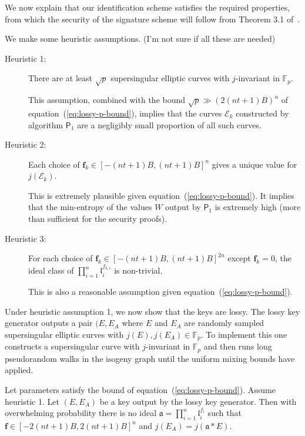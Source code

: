 \documentclass{llncs}
\newcommand{\E}{\mathcal{E}}
\newcommand{\F}{\mathbb{F}}
\renewcommand{\a}{\mathfrak{a}}
\renewcommand{\l}{\mathfrak{l}}
\newcommand{\f}{\mathbf{f}}
\newcommand{\PP}{\mathsf{P}}
\begin{document}
We now explain that our identification scheme satisfies the required properties, from which the security of the signature scheme will follow from Theorem 3.1 of~\cite{KLS18}.

We make some heuristic assumptions.
(I'm not sure if all these are needed)
\begin{description}
\item[Heuristic 1:] There are at least $\sqrt{p}$ supersingular elliptic curves with $j$-invariant in $\F_p$.

This assumption, combined with the bound $\sqrt{p} \gg (2(nt+1)B)^n $ of equation~(\ref{eq:lossy-p-bound}), implies that the curves $\E_k$ constructed by algorithm $\PP_1$ are a negligibly small proportion of all such curves.

\item[Heuristic 2:] Each choice of $\f_k \in [-(nt+1)B,(nt+1)B]^n$ gives a unique value for $j(\E_k)$.

This is extremely plausible given equation~(\ref{eq:lossy-p-bound}). It implies that the min-entropy of the values $W$ output by $\PP_1$ is extremely high (more than sufficient for the security proofs).

\item[Heuristic 3:] For each choice of $\f_k \in [-(nt+1)B,(nt+1)B]^{2n}$ except $\f_k = 0$, the ideal class of $\prod_{i=1}^n \l_i^{f_{k,i}}$ is non-trivial.

This is also a reasonable assumption given equation~(\ref{eq:lossy-p-bound}).
\end{description}

Under heuristic assumption 1, we now show that the keys are lossy.
The lossy key generator outputs a pair $(E,E_A$ where $E$ and $E_A$ are randomly sampled supersingular elliptic curves with $j(E), j(E_A) \in \F_p$.
To implement this one constructs a supersingular curve with $j$-invariant in $\F_p$
and then runs long pseudorandom walks in the isogeny graph until the uniform mixing bounds have applied.

\begin{lemma}\label{lem:isogeny count}
Let parameters satisfy the bound of equation~(\ref{eq:lossy-p-bound}). Assume heuristic 1. Let $(E,E_A)$ be a key output by the lossy key generator. Then with overwhelming probability there is no ideal $\a = \prod_{i=1}^n \l_i^{f_{i}}$ such that $\f \in [-2(nt+1)B,2(nt+1)B]^{n}$ and $j(E_A) = j( \a * E )$.
\end{lemma}
\end{document}
